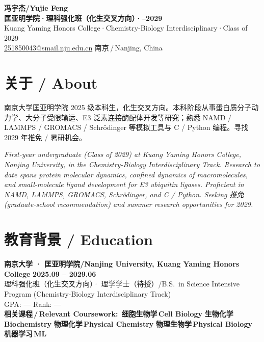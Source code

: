 \documentclass[11pt,a4paper]{article}
\newcommand{\purplechip}[1]{\colorbox{njupurplelight}{\textcolor{njupurple}{\footnotesize\bfseries\,#1\,}}}
\newcommand{\cvdateinline}[1]{{\color{njublue}\small\bfseries #1}}
\newcommand{\muted}[1]{{\color{mutedgray}\small #1}}
\begin{document}
\begin{tcolorbox}[
  enhanced,
  colback=njupurple, colframe=njupurple, coltext=white,
  arc=0pt, outer arc=0pt, boxrule=0pt,
  left=14pt, right=14pt, top=14pt, bottom=14pt,
  width=\textwidth,
]
\color{white}
{\Huge\bfseries 冯宇杰\;/\;Yujie Feng}\\[6pt]
{\large\bfseries 匡亚明学院\;·\;理科强化班（化生交叉方向）\;·--2029}\\[-2pt]
{\large Kuang Yaming Honors College\;·\;Chemistry-Biology Interdisciplinary\;·\;Class of 2029}\\[8pt]
{\small\faEnvelope\;\href{mailto:251850043@smail.nju.edu.cn}{251850043@smail.nju.edu.cn}%
\;\quad\faMapMarker*\;南京\,/\,Nanjing, China%
}
\end{tcolorbox}

\section*{关于 \quad / \quad About}
南京大学匡亚明学院 2025 级本科生，化生交叉方向。本科阶段从事蛋白质分子动力学、大分子受限输运、E3 泛素连接酶配体开发等研究；熟悉 NAMD / LAMMPS / GROMACS / Schrödinger 等模拟工具与 C / Python 编程。寻找 2029 年推免 / 暑研机会。

\medskip
\itshape\small
First-year undergraduate (Class of 2029) at Kuang Yaming Honors College, Nanjing University, in the Chemistry-Biology Interdisciplinary Track. Research to date spans protein molecular dynamics, confined dynamics of macromolecules, and small-molecule ligand development for E3 ubiquitin ligases. Proficient in NAMD, LAMMPS, GROMACS, Schrödinger, and C / Python. Seeking 推免 (graduate-school recommendation) and summer research opportunities for 2029.
\upshape\normalfont

\section*{教育背景 \quad / \quad Education}

\noindent\textbf{南京大学 · 匡亚明学院\;/\;Nanjing University, Kuang Yaming Honors College} \hfill \cvdateinline{2025.09 -- 2029.06}\\
理科强化班（化生交叉方向）· 理学学士（待授）\;/\;B.S.\ in Science Intensive Program (Chemistry-Biology Interdisciplinary Track)\\
\muted{GPA: --- \quad Rank: ---}\\[2pt]
\textbf{\small 相关课程\,/\,Relevant Coursework:}
\purplechip{细胞生物学\,Cell Biology}\purplechip{生物化学\,Biochemistry}\purplechip{物理化学\,Physical Chemistry}\purplechip{物理生物学\,Physical Biology}\purplechip{机器学习\,ML}
\end{document}
